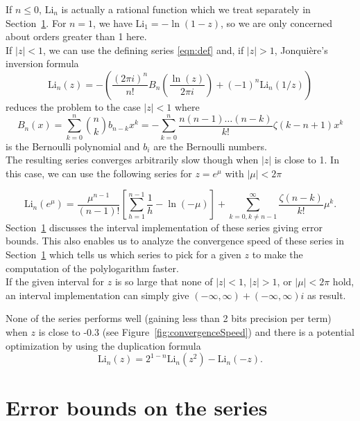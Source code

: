 \documentclass[utopia]{nmd/article}
\def\Li{\mathrm{Li}}
\begin{document}
If $n\leq 0$, $\Li_n$ is actually a rational function which we treat separately in Section~\ref{}. For $n=1$, we have $\Li_1=-\ln(1-z)$, so we are only concerned about orders greater than 1 here.\\
If $|z|<1$, we can use the defining series \eqref{eqn:def} and, if $|z|>1$, Jonqui\`e{}re's inversion formula 
 \cite{jonquiere89}
 \begin{equation} \label{eqn:inversion}
\Li_n(z) =  -\left( \frac{(2\pi i)^n}{n!} B_n\left(\frac{\ln(z)}{2\pi i}\right) + (-1)^n \Li_n(1/z) \right)
\end{equation}
reduces the problem to the case $|z|<1$ where
$$B_n(x)=\sum_{k=0}^n {n \choose k} b_{n-k} x^k = - \sum_{k=0}^n \frac{n (n-1) \dots (n-k)}{k!} \zeta(k-n+1) x^k$$
is the Bernoulli polynomial and $b_i$ are the Bernoulli numbers.\\
The resulting series converges arbitrarily slow though when $|z|$ is close to 1. In this case, we can use the following series for $z=e^\mu$ with $|\mu|<2\pi$%

\begin{equation} \label{eqn:series1}
\Li_n (e^\mu) = \frac{\mu^{n-1}}{(n-1)!} \left[\sum_{h=1}^{n-1} \frac{1}{h} - \ln(-\mu)\right] + 
\sum_{k=0,k\not=n-1}^\infty \frac{\zeta(n-k)}{k!} \mu^k.
\end{equation}
Section~\ref{} discusses the interval implementation of these series giving error bounds. This also enables us to analyze the convergence speed of these series in Section~\ref{} which tells us which series to pick for a given $z$ to make the computation of the polylogarithm faster.\\
If the given interval for $z$ is so large that none of $|z|<1$, $|z|>1$, or $|\mu|<2\pi$ hold, an interval implementation can simply give $(-\infty, \infty) + (-\infty, \infty)i$ as result.

\begin{remark}
None of the series performs well (gaining less than 2 bits precision per term) when $z$ is close to -0.3 (see Figure~\ref{fig:convergenceSpeed}) and there is a potential optimization by using the duplication formula \cite{clunie54, schroedinger52}
$$\Li_n(z) = 2^{1-n} \Li_n(z^2) - \Li_n(-z).$$
\end{remark}



\section{Error bounds on the series}
\end{document}
